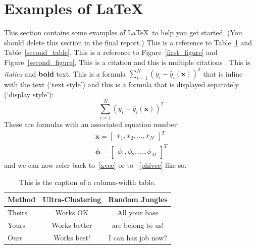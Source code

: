 \documentclass[10pt,twocolumn,letterpaper]{article}
\begin{document}
\section{Examples of \LaTeX}


This section contains some examples of \LaTeX~to help you get started.
(You should delete this section in the final report.)
This is a reference to Table~\ref{first_table} and Table~\ref{second_table}.
This is a reference to Figure~\ref{first_figure} and Figure~\ref{second_figure}.
This is a citation \cite{breiman2001statistical} and this is
multiple citations \cite{breiman2001statistical,bishop2006pattern}.
This is \textit{italics} and \textbf{bold} text.
This is a formula $\sum_{i=1}^N (y_i - \hat{y}_i(\mathbf{x}))^2$
that is inline with the text (`text style') and this is a
formula that is displayed separately (`display style'):
$$
\sum_{i=1}^N (y_i - \hat{y}_i(\mathbf{x}))^2
$$
These are formulas with an associated equation number
\begin{align}
   \mathbf{x} = \begin{bmatrix}
      x_1, x_2, \ldots, x_N
   \end{bmatrix}^T    \label{xvec}\\
   \boldsymbol{\phi} = \begin{bmatrix}
      \phi_1, \phi_2, \ldots, \phi_M
   \end{bmatrix}^T    \label{phivec}
\end{align}
and we can now refer back to~\eqref{xvec} or to ~\eqref{phivec} like so.



\begin{table}
   \begin{center}
   \begin{tabular}{|l|c|c|}
   \hline
   Method & Ultra-Clustering & Random Jungles \\
   \hline\hline
   Theirs & Works OK & All your base\\
   Yours & Works better & are belong to us!\\
   Ours & Works best! & I can haz job now?\\
   \hline
   \end{tabular}
   \end{center}
   \caption{This is the caption of a column-width table.\label{first_table}}
\end{table}
\end{document}
